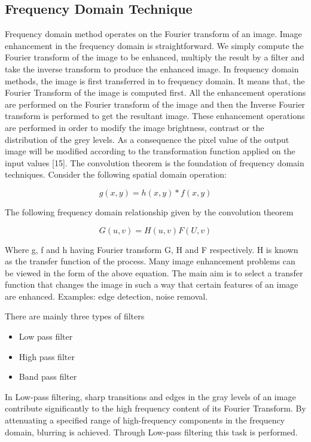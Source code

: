 \subsection{Frequency Domain Technique}
Frequency domain method operates on the Fourier transform of an image. Image enhancement in the frequency domain is straightforward. We simply compute the Fourier transform of the image to be enhanced, multiply the result by a filter and take the inverse transform to produce the enhanced image. In frequency domain methods, the image is first transferred in to frequency domain. It means that, the Fourier Transform of the image is computed first. All the enhancement operations are performed on the Fourier transform of the image and then the Inverse Fourier transform is performed to get the resultant image. These enhancement operations are performed in order to modify the image brightness, contrast or the distribution of the grey levels. As a consequence the pixel value of the output image will be modified according to the transformation function applied on the input values [15]. The convolution theorem is the foundation of frequency domain techniques. Consider the following spatial domain operation:

\begin{equation}
	g(x,y)=h(x,y)*f(x,y)
\end{equation}

The following frequency domain relationship given by the convolution theorem 

\begin{equation}
	G (u, v) = H (u, v) F (U, v)
\end{equation}


Where g, f and h having Fourier transform G, H and F respectively. H is known as the transfer function of the process. Many image enhancement problems can be viewed in the form of the above equation. The main aim is to select a transfer function that changes the image in such a way that certain features of an image are enhanced. Examples: edge detection, noise removal.

There are mainly three types of filters
\begin{itemize}
	\item Low pass filter
	\item High pass filter
	\item Band pass filter

\end{itemize}

In Low-pass filtering, sharp transitions and edges in the gray levels of an image contribute significantly to the high frequency content of its Fourier Transform. By attenuating a specified range of high-frequency components in the frequency domain, blurring is achieved. Through Low-pass filtering this task is performed.

